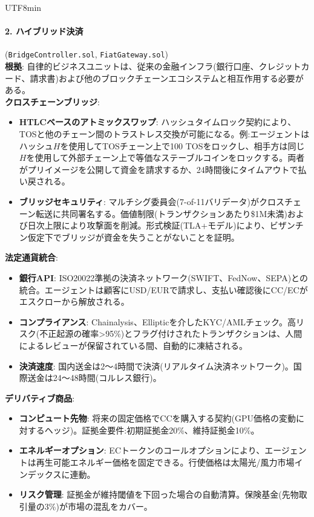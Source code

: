 \documentclass[11pt]{article}
\begin{document}
\begin{CJK}{UTF8}{min}
\paragraph{2. ハイブリッド決済} (\texttt{BridgeController.sol}, \texttt{FiatGateway.sol})\\
\textbf{根拠}: 自律的ビジネスユニットは、従来の金融インフラ(銀行口座、クレジットカード、請求書)および他のブロックチェーンエコシステムと相互作用する必要がある。\\
\textbf{クロスチェーンブリッジ}:
\begin{itemize}[noitemsep]
  \item \textbf{HTLCベースのアトミックスワップ}: ハッシュタイムロック契約により、TOSと他のチェーン間のトラストレス交換が可能になる。例:エージェントはハッシュ$H$を使用してTOSチェーン上で100 TOSをロックし、相手方は同じ$H$を使用して外部チェーン上で等価なステーブルコインをロックする。両者がプリイメージを公開して資金を請求するか、24時間後にタイムアウトで払い戻される。
  \item \textbf{ブリッジセキュリティ}: マルチシグ委員会(7-of-11バリデータ)がクロスチェーン転送に共同署名する。価値制限(トランザクションあたり\$1M未満)および日次上限により攻撃面を削減。形式検証(TLA+モデル)により、ビザンチン仮定下でブリッジが資金を失うことがないことを証明。
\end{itemize}
\textbf{法定通貨統合}:
\begin{itemize}[noitemsep]
  \item \textbf{銀行API}: ISO20022準拠の決済ネットワーク(SWIFT、FedNow、SEPA)との統合。エージェントは顧客にUSD/EURで請求し、支払い確認後にCC/ECがエスクローから解放される。
  \item \textbf{コンプライアンス}: Chainalysis、Ellipticを介したKYC/AMLチェック。高リスク(不正起源の確率>95\%)とフラグ付けされたトランザクションは、人間によるレビューが保留されている間、自動的に凍結される。
  \item \textbf{決済速度}: 国内送金は2〜4時間で決済(リアルタイム決済ネットワーク)。国際送金は24〜48時間(コルレス銀行)。
\end{itemize}
\textbf{デリバティブ商品}:
\begin{itemize}[noitemsep]
  \item \textbf{コンピュート先物}: 将来の固定価格でCCを購入する契約(GPU価格の変動に対するヘッジ)。証拠金要件:初期証拠金20\%、維持証拠金10\%。
  \item \textbf{エネルギーオプション}: ECトークンのコールオプションにより、エージェントは再生可能エネルギー価格を固定できる。行使価格は太陽光/風力市場インデックスに連動。
  \item \textbf{リスク管理}: 証拠金が維持閾値を下回った場合の自動清算。保険基金(先物取引量の3\%)が市場の混乱をカバー。
\end{itemize}


\end{CJK}
\end{document}
